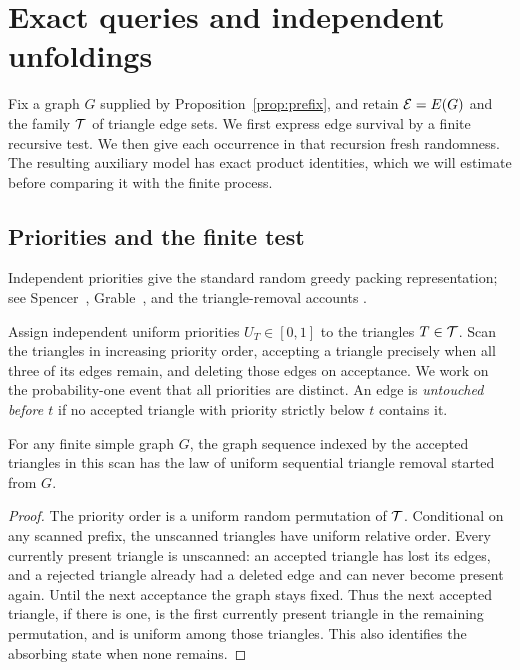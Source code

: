\section{Exact queries and independent unfoldings}
\label{sec:queries}

Fix a graph $G$ supplied by Proposition~\ref{prop:prefix}, and retain
$\mathcal E=E(G)$ and the family $\mathcal T$ of triangle edge sets.  We first express
edge survival by a finite recursive test.  We then give each occurrence
in that recursion fresh randomness.  The resulting auxiliary model has
exact product identities, which we will estimate before comparing it
with the finite process.

\subsection{Priorities and the finite test}

Independent priorities give the standard random greedy packing
representation; see Spencer~\cite[Section~1]{Spencer1995},
Grable~\cite[Section~1]{Grable1997}, and the triangle-removal accounts
\cite[Section~1.2]{BohmanFriezeLubetzky2015}
\cite[Section~14.1]{joosKuehn2025}.

Assign independent uniform priorities $U_T\in[0,1]$ to the triangles
$T\in\mathcal T$.  Scan the triangles in increasing priority order, accepting a
triangle precisely when all three of its edges remain, and deleting
those edges on acceptance.  We work on the probability-one event that
all priorities are distinct.  An edge is \emph{untouched before $t$} if
no accepted triangle with priority strictly below $t$ contains it.

\begin{lemma}\label{lem:priority}
For any finite simple graph $G$, the graph sequence indexed by the
accepted triangles in this scan has the law of uniform sequential
triangle removal started from $G$.
\end{lemma}

\begin{proof}
The priority order is a uniform random permutation of $\mathcal T$.
Conditional on any scanned prefix, the unscanned triangles have uniform
relative order.  Every currently present triangle is unscanned: an
accepted triangle has lost its edges, and a rejected triangle already
had a deleted edge and can never become present again.  Until the next
acceptance the graph stays fixed.  Thus the next accepted triangle, if
there is one, is the first currently present triangle in the remaining
permutation, and is uniform among those triangles.  This also identifies
the absorbing state when none remains.
\end{proof}

